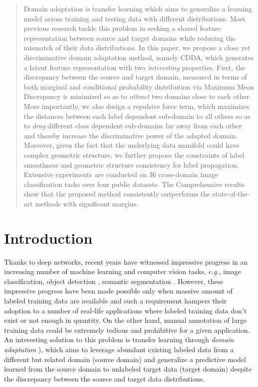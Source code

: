 \documentclass[10pt,twocolumn,letterpaper]{article}
\begin{document}
\begin{CJK*}{UTF8}{gkai}
\begin{abstract}
Domain adaptation is transfer learning which aims to generalize a learning model across training and testing data with different distributions. Most previous research tackle this problem in seeking a shared feature representation between source and target domains while reducing the mismatch of their data distributions. In this paper, we propose a close yet discriminative domain adaptation method, namely CDDA, which generates a latent feature representation with two \emph{interesting} properties. First, the discrepancy between the source and target domain, measured in terms of both  marginal and conditional probability distribution via Maximum Mean Discrepancy is minimized so as to \emph{attract} two domains close to each other. More importantly, we also design a repulsive force term, which maximizes the distances between each label dependent sub-domain to all others so as to \emph{drag} different class dependent sub-domains far away from each other and thereby increase the discriminative power of the  adapted domain. Moreover, given the fact that the underlying data manifold could have complex geometric structure, we further propose the constraints of label smoothness and geometric structure consistency for label propagation. Extensive experiments are conducted on  36 cross-domain image classification tasks over four public datasets. The Comprehensive results show that the proposed method consistently outperforms the state-of-the-art methods with significant margins.
\end{abstract}
\section{Introduction}



Thanks to deep networks, recent years have witnessed impressive progress in an increasing number of machine learning and computer vision tasks, \textit{e.g.},  image classification\cite{ILSVRC15,He2015}, object detection \cite{Everingham15,girshickICCV15fastrcnn}, semantic segmentation \cite{Cordts2016Cityscapes,Everingham15,zhao2016pspnet}. However, these impressive progress have been made possible only when massive amount of labeled training data are available and such a requirement hampers their adoption to a number of real-life applications where labeled training data don't exist or not enough in quantity. On the other hand, manual annotation of large training data could be extremely tedious and prohibitive for a given application. An interesting solution to this problem is transfer learning through \textit{domain adaptation} \cite{pan2010survey}), which aims to leverage abundant existing labeled data from a different but related domain (source domain) and generalize a predictive model learned from the source domain to unlabeled target data (target domain) despite the discrepancy between the source and target data distributions.       


\end{CJK*}
\end{document}
